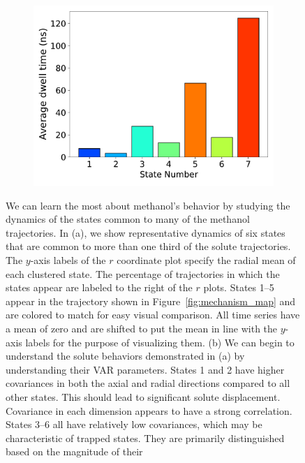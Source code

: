 \documentclass{article}
\begin{document}
\begin{figure}
\begin{subfigure}{0.35\textwidth}
  \caption{}\label{fig:A_sigma_scatter_MET}
  \includegraphics[width=\textwidth]{dwell_times_MET.pdf}  %
  \caption{}\label{fig:dwell_times_MET}
  \end{subfigure}
  \caption{We can learn the most about methanol's behavior by studying the dynamics
  of the states common to many of the methanol trajectories. In (a), we show representative
  dynamics of six states that are common to more than one third of the solute trajectories. 
  The $y$-axis labels of the $r$ coordinate plot specify the radial mean of each clustered 
  state. 
The percentage of trajectories in which the states appear are labeled to the right of
  the $r$ plots. States 1--5 appear in the trajectory shown in Figure~\ref{fig:mechanism_map}
  and are colored to match for easy visual comparison. All time series have a mean of zero and are
  shifted to put the mean in line with the $y$-axis labels for the purpose of visualizing them. 
  (b) We can begin to understand the solute behaviors demonstrated in (a) by understanding their VAR 
  parameters. States 1 and 2 have higher covariances in both the axial and radial directions compared
  to all other states. This should lead to significant solute displacement. Covariance in each dimension
  appears to have a strong correlation. States 3--6 all have relatively low covariances, which may
  be characteristic of trapped states. They are primarily distinguished based on the magnitude of their 
}
\end{figure}
\end{document}
